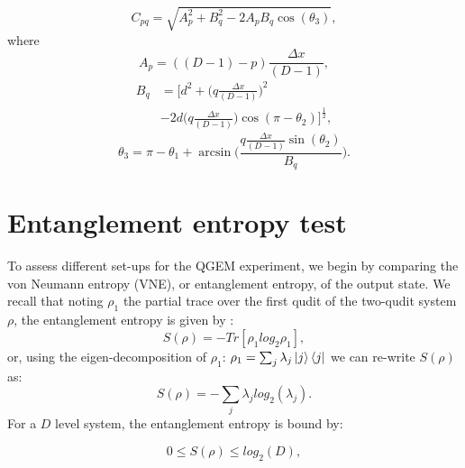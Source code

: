 \documentclass[%
 12pt,
 superscriptaddress,
 amsmath,
 amssymb,
 onecolumn,
 longbibliography
]{revtex4-2}
\begin{document}
            \begin{equation}
			    C_{pq} = \sqrt{A_p^2 + B_q^2 - 2A_pB_q\cos(\theta_3)},
		    \end{equation}	
		    where
			\begin{equation}
			    A_p = ((D-1) - p)\frac{\Delta x}{(D - 1)},
		    \end{equation}
			\begin{align}
			    B_q &= [d^2 + \bigg(q\frac{\Delta x}{(D - 1)}\bigg)^2 \nonumber \\
			    &- 2d\bigg(q\frac{\Delta x}{(D - 1)}\bigg)\cos{(\pi -\theta_2)}]^{\frac{1}{2}},
		    \end{align}
			\begin{equation}
			    \theta_3 = \pi - \theta_1 +\arcsin{\bigg(\frac{q\frac{\Delta x}{(D - 1)}\sin(\theta_2)}{B_q}\bigg)}.
		    \end{equation}


\section{Entanglement entropy test \label{sec:VNE}}

\indent To assess different set-ups for the QGEM experiment, we begin by comparing the von Neumann entropy (VNE), or entanglement entropy, of the output state. We recall that noting $\rho_1$ the partial trace over the first qudit of the two-qudit system $\rho$, the entanglement entropy is given by \cite{Bengtsson_book}:
		\begin{equation}
			S(\rho) = -Tr[\rho_1log_2\rho_1],
		\end{equation}
or, using the eigen-decomposition of $\rho_1$: $\rho_1=\sum_{j}\lambda_j \Ket{j}\Bra{j}$ we can re-write $S(\rho)$ as:
		\begin{equation} \label{VNEformula}
			S(\rho) = -\sum_{j}\lambda_j log_2(\lambda_j).
		\end{equation}
\indent For a $D$ level system, the entanglement entropy is bound by:

		\begin{equation} \label{VQE_bounds}
			0\leq S(\rho) \leq log_2 (D),
		\end{equation}
		
\end{document}
